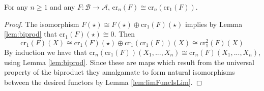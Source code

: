 \begin{lem}[label=lem:idempotCr1]
    For any $n \geq 1$ and any $F:\mathcal{B}\rightarrow \mathcal{A}$, $\text{cr}_n(F)\cong \text{cr}_n(\text{cr}_1(F))$.
\end{lem}
\begin{proof}
    The isomorphism $F(\star) \cong F(\star)\oplus \text{cr}_1(F)(\star)$ implies by Lemma \ref{lem:biprod} that $\text{cr}_1(F)(\star)\cong 0$. Then 
    \begin{equation*}
        \text{cr}_1(F)(X) \cong \text{cr}_1(F)(\star)\oplus \text{cr}_1(\text{cr}_1(F))(X) \cong \text{cr}_1^2(F)(X)
    \end{equation*}
    By induction we have that $\text{cr}_n(\text{cr}_1(F))(X_1,...,X_n) \cong \text{cr}_n(F)(X_1,...,X_n)$, using Lemma \ref{lem:biprod}. Since these are maps which result from the universal property of the biproduct they amalgamate to form natural isomorphisms between the desired functors by Lemma \ref{lem:limFuncIsLim}.
\end{proof}

